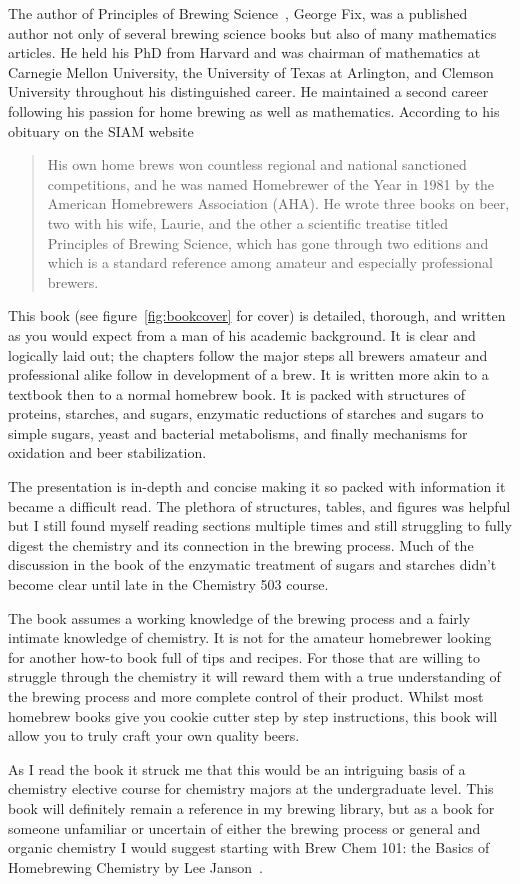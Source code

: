 The author of Principles of Brewing Science~\cite{principles}, George Fix, was
a published author not only of several brewing science books but also of many
mathematics articles. He held his PhD from Harvard and was chairman of
mathematics at Carnegie Mellon University, the University of Texas at
Arlington, and Clemson University throughout his distinguished career. He
maintained a second career following his passion for home brewing as well as
mathematics. According to his obituary on the \gls{SIAM} website
\begin{quotation}
His own home brews won countless regional and national sanctioned
competitions, and he was named Homebrewer of the Year in 1981 by the American
Homebrewers Association (AHA). He wrote three books on beer, two with his
wife, Laurie, and the other a scientific treatise titled Principles of Brewing
Science, which has gone through two editions and which is a standard reference
among amateur and especially professional brewers.
\end{quotation}
This book  (see figure~\ref{fig:bookcover} for cover) is detailed, thorough,
and written as you would expect from a man of his academic background. It is
clear and logically laid out; the chapters follow the major steps all brewers
amateur and professional alike follow in development of a brew. It is written
more akin to a textbook then to a normal homebrew book. It is packed with
structures of proteins, starches, and sugars, enzymatic reductions of starches
and sugars to simple sugars, yeast and bacterial metabolisms, and finally
mechanisms for oxidation and beer stabilization.

The presentation is in-depth and concise making it so packed with information
it became a difficult read. The plethora of structures, tables, and figures
was helpful but I still found myself reading sections multiple times and still
struggling to fully digest the chemistry and its connection in the brewing
process. Much of the discussion in the book of the enzymatic treatment of
sugars and starches didn't become clear until late in the Chemistry 503
course.

The book assumes a working knowledge of the brewing process and a fairly
intimate knowledge of chemistry. It is not for the amateur homebrewer looking
for another how-to book full of tips and recipes.  For those that are willing
to struggle through the chemistry it will reward them with a true
understanding of the brewing process and more complete control of their
product. Whilst most homebrew books give you cookie cutter step by step
instructions, this book will allow you to truly craft your own quality beers.

As I read the book it struck me that this would be an intriguing basis of a
chemistry elective course for chemistry majors at the undergraduate level.
This book will definitely remain a reference in my brewing library, but as a
book for someone unfamiliar or uncertain of either the brewing process or
general and organic chemistry I would suggest starting with Brew Chem 101: the
Basics of Homebrewing Chemistry by Lee Janson~\cite{brewchem101}.

